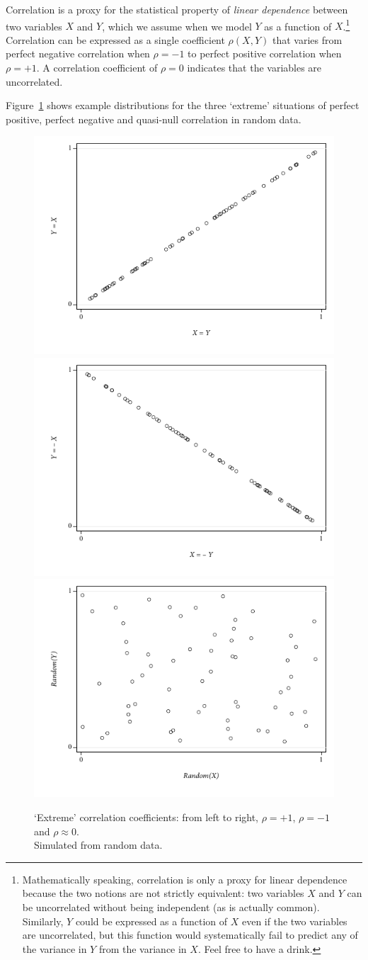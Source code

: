   Correlation is a proxy for the statistical property of \emph{linear dependence} between two variables $X$ and $Y$, which we assume when we model $Y$ as a function of $X$.\footnote{Mathematically speaking, correlation is only a proxy for linear dependence because the two notions are not strictly equivalent: two variables $X$ and $Y$ can be uncorrelated without being independent (as is actually common). Similarly, $Y$ could be expressed as a function of $X$ even if the two variables are uncorrelated, but this function would systematically fail to predict any of the variance in $Y$ from the variance in $X$. Feel free to have a drink.} Correlation can be expressed as a single coefficient $\rho (X,Y)$ that varies from perfect negative correlation when $\rho = -1$ to perfect positive correlation when $\rho = +1$. A correlation coefficient of $\rho = 0$ indicates that the variables are uncorrelated.

  Figure~\ref{fig:correlation_examples} shows example distributions for the three `extreme' situations of perfect positive, perfect negative and quasi-null correlation in random data.

  \begin{figure}[htp]
  	\centering
  	\includegraphics[width=.32\textwidth]{images/correlate_pos.pdf}
  	\includegraphics[width=.32\textwidth]{images/correlate_neg.pdf}
  	\includegraphics[width=.32\textwidth]{images/correlate_rnd.pdf}

  	\caption[`Extreme' correlation coefficients]{\label{fig:correlation_examples}
  	`Extreme' correlation coefficients: from left to right, $\rho = +1$, $\rho = -1$ and $\rho \approx 0$.\\
  	Simulated from random data.}
  \end{figure}%

